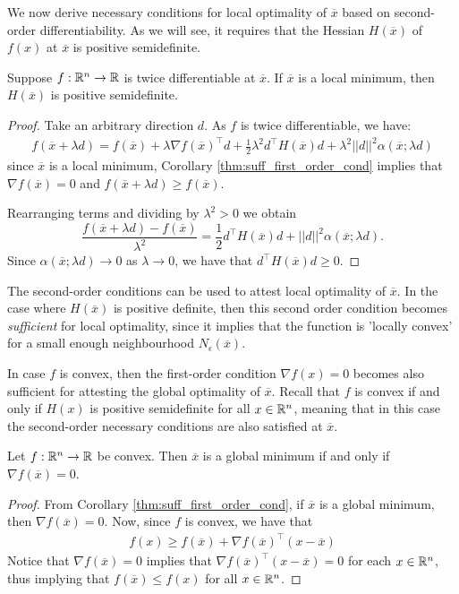 We now derive necessary conditions for local optimality of $\overline{x}$ based on second-order differentiability. As we will see, it requires that the Hessian $H(\overline{x})$ of $f(x)$ at $\overline{x}$ is positive semidefinite.
%
\begin{theorem}\label{thm:second_order}
Suppose $f: \mathbb{R}^n \rightarrow \mathbb{R}$ is twice differentiable at $\overline{x}$. If $\overline{x}$ is a local minimum, then $H(\overline{x})$ is positive semidefinite.
\end{theorem}
%
\begin{proof}
Take an arbitrary direction $d$. As $f$ is twice differentiable, we have:
%
\begin{align*}
f(\overline{x} + \lambda d) = f(\overline{x}) + \lambda \nabla f(\overline{x})^\top d + \frac{1}{2}\lambda^ 2d^\top H(\overline{x}) d + \lambda^2||d||^2\alpha(\overline{x}; \lambda d)
\end{align*}
%
since $\overline{x}$ is a local minimum, Corollary \ref{thm:suff_first_order_cond} implies that $\nabla f(\overline{x})=0$ and $f(\overline{x} + \lambda d) \geq f(\overline{x})$. 

Rearranging terms and dividing by $\lambda^2 > 0$ we obtain
$$\frac{f(\overline{x} + \lambda d)-f(\overline{x})}{\lambda^2} =  \frac{1}{2}d^\top H(\overline{x}) d+ ||d||^2\alpha(\overline{x};\lambda d).
$$
Since $\alpha(\overline{x};\lambda d) \rightarrow 0$ as $\lambda \rightarrow 0$, we have that $d^\top H(\overline{x}) d \geq 0$.
\end{proof}

The second-order conditions can be used to attest local optimality of $\overline{x}$. In the case where $H(\overline{x})$ is positive definite, then this second order condition becomes \emph{sufficient} for local optimality, since it implies that the function is 'locally convex' for a small enough neighbourhood $N_\epsilon(\overline{x})$.

In case $f$ is convex, then the first-order condition $\nabla f(x) = 0$ becomes also sufficient for attesting the global optimality of $\overline{x}$. Recall that $f$ is convex if and only if $H(x)$ is positive semidefinite for all $x \in \mathbb{R}^n$, meaning that in this case the second-order necessary conditions are also satisfied at $\overline{x}$.
%
\begin{theorem}
Let $f: \mathbb{R}^n \to \mathbb{R}$ be convex. Then $\overline{x}$ is a global minimum if and only if $\nabla f(\overline{x}) = 0$.
\end{theorem}
%
\begin{proof}
From Corollary \ref{thm:suff_first_order_cond}, if $\overline{x}$ is a global minimum, then $\nabla f(\overline{x}) = 0$. Now, since $f$ is convex, we have that
%
\begin{align*}
f(x) \geq f(\overline{x}) + \nabla f(\overline{x})^\top (x - \overline{x})
\end{align*}
%
Notice that $\nabla f(\overline{x}) = 0$ implies that $\nabla f(\overline{x})^\top (x - \overline{x}) = 0$ for each $x \in \mathbb{R}^n$, thus implying that $f(\overline{x}) \leq f(x)$ for all $x \in \mathbb{R}^n$.
\end{proof}
